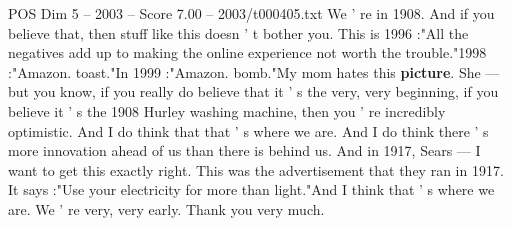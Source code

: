 \begin{textsample}{POS Dim 5 – 2003 – Score 7.00 – 2003/t000405.txt}
We ' re in 1908.
And if you believe that, then stuff like this doesn ' t bother you.
This is 1996 :"All the negatives add up to making the online experience not worth the trouble."1998 :"Amazon. toast."In 1999 :"Amazon. bomb."My mom hates this \textbf{picture}.
She — but you know, if you really do believe that it ' s the very, very beginning, if you believe it ' s the 1908 Hurley washing machine, then you ' re incredibly optimistic.
And I do think that that ' s where we are.
And I do think there ' s more innovation ahead of us than there is behind us.
And in 1917, Sears — I want to get this exactly right.
This was the advertisement that they ran in 1917.
It says :"Use your electricity for more than light."And I think that ' s where we are.
We ' re very, very early.
Thank you very much.

\end{textsample}
